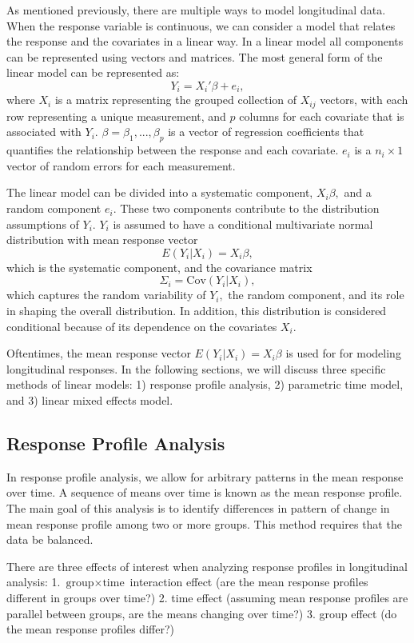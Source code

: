 \documentclass[12pt, twoside]{amherstthesis}
\begin{document}
As mentioned previously, there are multiple ways to model longitudinal data. When the response variable is continuous, we can consider a model that relates the response and the covariates in a linear way. In a linear model all components can be represented using vectors and matrices. The most general form of the linear model can be represented as:
\[Y_i=X_i'\beta + e_i,\] where \(X_i\) is a matrix representing the grouped collection of \(X_{ij}\) vectors, with each row representing a unique measurement, and \(p\) columns for each covariate that is associated with \(Y_i.\) \(\beta = \beta_1,...,\beta_p\) is a vector of regression coefficients that quantifies the relationship between the response and each covariate. \(e_i\) is a \(n_i \times 1\) vector of random errors for each measurement.

The linear model can be divided into a systematic component, \(X_i\beta,\) and a random component \(e_i.\) These two components contribute to the distribution assumptions of \(Y_i.\) \(Y_i\) is assumed to have a conditional multivariate normal distribution with mean response vector \[E(Y_i|X_i) = X_i\beta,\] which is the systematic component, and the covariance matrix \[\Sigma_i = \text{Cov}(Y_i|X_i),\] which captures the random variability of \(Y_i,\) the random component, and its role in shaping the overall distribution. In addition, this distribution is considered conditional because of its dependence on the covariates \(X_i.\)

Oftentimes, the mean response vector \(E(Y_i|X_i) = X_i\beta\) is used for for modeling longitudinal responses. In the following sections, we will discuss three specific methods of linear models: 1) response profile analysis, 2) parametric time model, and 3) linear mixed effects model.

\hypertarget{response-profile-analysis}{%
\subsection{Response Profile Analysis}\label{response-profile-analysis}}

In response profile analysis, we allow for arbitrary patterns in the mean response over time. A sequence of means over time is known as the mean response profile. The main goal of this analysis is to identify differences in pattern of change in mean response profile among two or more groups. This method requires that the data be balanced.

There are three effects of interest when analyzing response profiles in longitudinal analysis:
1. \(\text{group} \times \text{time}\) interaction effect (are the mean response profiles different in groups over time?)
2. time effect (assuming mean response profiles are parallel between groups, are the means changing over time?)
3. group effect (do the mean response profiles differ?)
\end{document}
